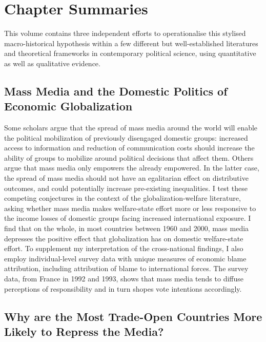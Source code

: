 \documentclass[12pt]{report}
\begin{document}
\section{Chapter Summaries}

This volume contains three independent efforts to operationalise this stylised macro-historical
hypothesis within a few different but well-established literatures and theoretical frameworks in
contemporary political science, using quantitative as well as qualitative evidence.


\subsection{Mass Media and the Domestic Politics of Economic Globalization}

Some scholars argue that the spread of mass media around the world will enable the political
mobilization of previously disengaged domestic groups: increased access to information and reduction
of communication costs should increase the ability of groups to mobilize around political decisions
that affect them. Others argue that mass media only empowers the already empowered. In the latter
case, the spread of mass media should not have an egalitarian effect on distributive outcomes, and
could potentially increase pre-existing inequalities. I test these competing conjectures in the
context of the globalization-welfare literature, asking whether mass media makes welfare-state
effort more or less responsive to the income losses of domestic groups facing increased
international exposure. I find that on the whole, in most countries between 1960 and 2000, mass
media depresses the positive effect that globalization has on domestic welfare-state effort. To
supplement my interpretation of the cross-national findings, I also employ individual-level survey
data with unique measures of economic blame attribution, including attribution of blame to
international forces. The survey data, from France in 1992 and 1993, shows that mass media tends to
diffuse perceptions of responsibility and in turn shopes vote intentions accordingly.

\subsection{Why are the Most Trade-Open Countries More Likely to Repress the Media?}
\end{document}
